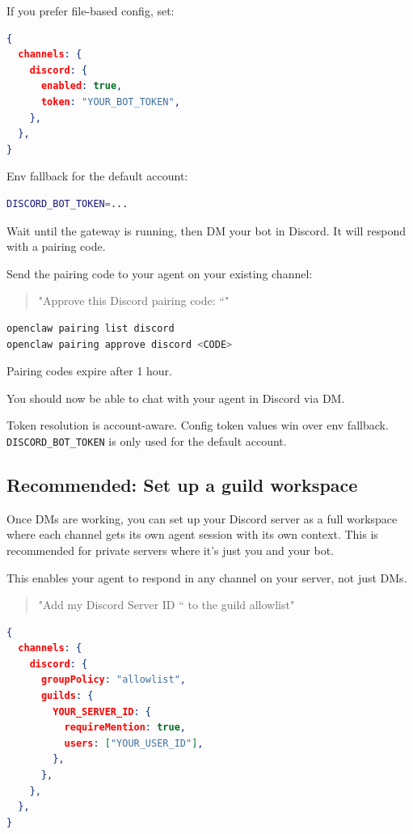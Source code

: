 If you prefer file-based config, set:

\begin{lstlisting}[language=json]
{
  channels: {
    discord: {
      enabled: true,
      token: "YOUR_BOT_TOKEN",
    },
  },
}
\end{lstlisting}


Env fallback for the default account:

\begin{lstlisting}[language=bash]
DISCORD_BOT_TOKEN=...
\end{lstlisting}




Wait until the gateway is running, then DM your bot in Discord. It will respond with a pairing code.

Send the pairing code to your agent on your existing channel:

\begin{quote}
"Approve this Discord pairing code: ``"
\end{quote}


\begin{lstlisting}[language=bash]
openclaw pairing list discord
openclaw pairing approve discord <CODE>
\end{lstlisting}



Pairing codes expire after 1 hour.

You should now be able to chat with your agent in Discord via DM.


Token resolution is account-aware. Config token values win over env fallback. \texttt{DISCORD\_BOT\_TOKEN} is only used for the default account.

\subsection{Recommended: Set up a guild workspace}


Once DMs are working, you can set up your Discord server as a full workspace where each channel gets its own agent session with its own context. This is recommended for private servers where it's just you and your bot.

This enables your agent to respond in any channel on your server, not just DMs.

\begin{quote}
"Add my Discord Server ID `` to the guild allowlist"
\end{quote}


\begin{lstlisting}[language=json]
{
  channels: {
    discord: {
      groupPolicy: "allowlist",
      guilds: {
        YOUR_SERVER_ID: {
          requireMention: true,
          users: ["YOUR_USER_ID"],
        },
      },
    },
  },
}
\end{lstlisting}




